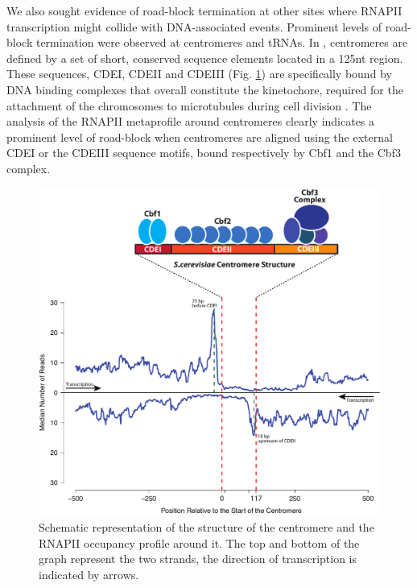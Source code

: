 We also sought evidence of road-block termination at other sites where RNAPII transcription might collide with DNA-associated events. Prominent levels of road-block termination were observed at centromeres and tRNAs. In \cer{}, centromeres are defined by a set of short, conserved sequence elements located in a 125nt region. These sequences, CDEI, CDEII and CDEIII (Fig. \ref{fig:ten}) are specifically bound by DNA binding complexes that overall constitute the kinetochore, required for the attachment of the chromosomes to microtubules during cell division \cite[for review see][]{mckinley:2015:molecular}. The analysis of the RNAPII metaprofile around centromeres clearly indicates a prominent level of road-block when centromeres are aligned using the external CDEI or the CDEIII sequence motifs, bound respectively by Cbf1 and the Cbf3 complex. 

\begin{figure}[h]

\centering
\includegraphics[width=\textwidth]{figures/results/rap/ten.pdf}
\caption[Centromere structure and polymerase occupancy profile]{Schematic representation of the structure of the centromere and the RNAPII occupancy profile around it. The top and bottom of the graph represent the two strands, the direction of transcription is indicated by arrows.}
\label{fig:ten}

\end{figure}


